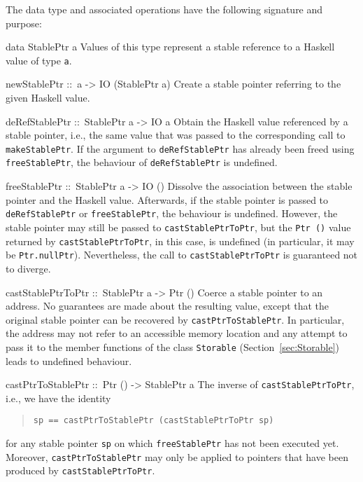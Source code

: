 \documentclass[a4paper,twoside]{article}
\makeatletter
\newcommand{\code}[1]{\texttt{#1}}      %
\newenvironment{codedesc}{%
  \list{}{\labelwidth\z@
    \let\makelabel\codedesclabel}
  }{%
  \endlist
  }
\newcommand*{\codedesclabel}[1]{%
  \hspace{-\leftmargin}
  \parbox[b]{\labelwidth}{\makebox[0pt][l]{\code{#1}}\\}\hfil\relax
  }
\makeatother
\begin{document}
The data type and associated operations have the following signature and
purpose:
%
\begin{codedesc}
\item[data StablePtr a] Values of this type represent a stable reference to a
  Haskell value of type \code{a}.
  
\item[newStablePtr ::\ a -> IO (StablePtr a)] Create a stable pointer
  referring to the given Haskell value.
  
\item[deRefStablePtr ::\ StablePtr a -> IO a] Obtain the Haskell value
  referenced by a stable pointer, i.e., the same value that was passed to the
  corresponding call to \code{makeStablePtr}.  If the argument to
  \code{deRefStablePtr} has already been freed using \code{freeStablePtr}, the
  behaviour of \code{deRefStablePtr} is undefined.
  
\item[freeStablePtr ::\ StablePtr a -> IO ()] Dissolve the association between
  the stable pointer and the Haskell value. Afterwards, if the stable pointer
  is passed to \code{deRefStablePtr} or \code{freeStablePtr}, the behaviour is
  undefined.  However, the stable pointer may still be passed to
  \code{castStablePtrToPtr}, but the \code{Ptr ()} value returned by
  \code{castStablePtrToPtr}, in this case, is undefined (in particular, it may
  be \code{Ptr.nullPtr}).  Nevertheless, the call to \code{castStablePtrToPtr}
  is guaranteed not to diverge.
  
\item[castStablePtrToPtr ::\ StablePtr a -> Ptr ()] Coerce a stable pointer to
  an address. No guarantees are made about the resulting value, except that
  the original stable pointer can be recovered by \code{castPtrToStablePtr}.
  In particular, the address may not refer to an accessible memory location and
  any attempt to pass it to the member functions of the class \code{Storable}
  (Section~\ref{sec:Storable}) leads to undefined behaviour.
  
\item[castPtrToStablePtr ::\ Ptr () -> StablePtr a] The inverse of
  \code{castStablePtrToPtr}, i.e., we have the identity
  \begin{quote}
\begin{verbatim}
sp == castPtrToStablePtr (castStablePtrToPtr sp)
\end{verbatim}
  \end{quote}
  for any stable pointer \code{sp} on which \code{freeStablePtr} has not been
  executed yet.  Moreover, \code{castPtrToStablePtr} may only be applied to
  pointers that have been produced by \code{castStablePtrToPtr}.
\end{codedesc}
\end{document}
